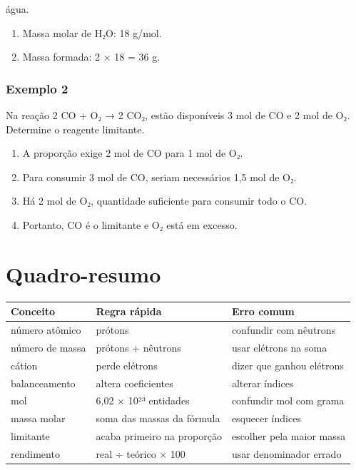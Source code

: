 \documentclass[11pt,a4paper]{article}
\begin{document}
   água.

\begin{enumerate}
  \item Massa molar de H₂O: 18 g/mol.
  \item Massa formada: 2 × 18 = 36 g.
\end{enumerate}

\subsubsection*{Exemplo 2}

Na reação 2 CO + O₂ → 2 CO₂, estão disponíveis 3 mol de CO e 2 mol de O₂. Determine o reagente limitante.

\begin{enumerate}
  \item A proporção exige 2 mol de CO para 1 mol de O₂.
  \item Para consumir 3 mol de CO, seriam necessários 1,5 mol de O₂.
  \item Há 2 mol de O₂, quantidade suficiente para consumir todo o CO.
  \item Portanto, CO é o limitante e O₂ está em excesso.
\end{enumerate}

\section*{Quadro-resumo}

\begin{tabularx}{\linewidth}{llX}
\toprule
 \textbf{Conceito} & \textbf{Regra rápida} & \textbf{Erro comum} \\
\midrule
 número atômico & prótons & confundir com nêutrons \\
 número de massa & prótons + nêutrons & usar elétrons na soma \\
 cátion & perde elétrons & dizer que ganhou elétrons \\
 balanceamento & altera coeficientes & alterar índices \\
 mol & 6,02 × 10²³ entidades & confundir mol com grama \\
 massa molar & soma das massas da fórmula & esquecer índices \\
 limitante & acaba primeiro na proporção & escolher pela maior massa \\
 rendimento & real ÷ teórico × 100 & usar denominador errado \\
\bottomrule
\end{tabularx}
\end{document}
